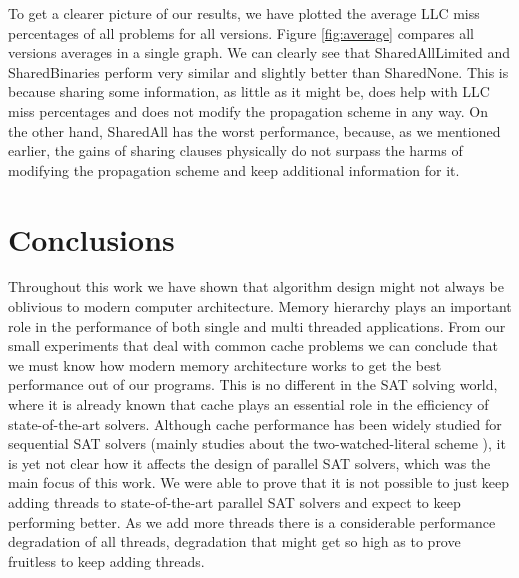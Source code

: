 \documentclass[12pt]{diicc}
\begin{document}
To get a clearer picture of our results, we have plotted the average LLC miss percentages of all problems for all versions. Figure \ref{fig:average} compares all versions averages in a single graph. We can clearly see that SharedAllLimited and SharedBinaries perform very similar and slightly better than SharedNone. This is because sharing some information, as little as it might be, does help with LLC miss percentages and does not modify the propagation scheme in any way. On the other hand, SharedAll has the worst performance, because, as we mentioned earlier, the gains of sharing clauses physically do not surpass the harms of modifying the propagation scheme and keep additional information for it.


%
% 
\chapter{Conclusions}\label{chap:conclusion}

Throughout this work we have shown that algorithm design might not always be oblivious to modern computer architecture. Memory hierarchy plays an important role in the performance of both single and multi threaded applications. From our small experiments that deal with common cache problems we can conclude that we must know how modern memory architecture works to get the best performance out of our programs. This is no different in the SAT solving world, where it is already known that cache plays an essential role in the efficiency of state-of-the-art solvers. Although cache performance has been widely studied for sequential SAT solvers (mainly studies about the two-watched-literal scheme \cite{chaff}), it is yet not clear how it affects the design of parallel SAT solvers, which was the main focus of this work. We were able to prove that it is not possible to just keep adding threads to state-of-the-art parallel SAT solvers and expect to keep performing better. As we add more threads there is a considerable performance degradation of all threads, degradation that might get so high as to prove fruitless to keep adding threads.
\end{document}
